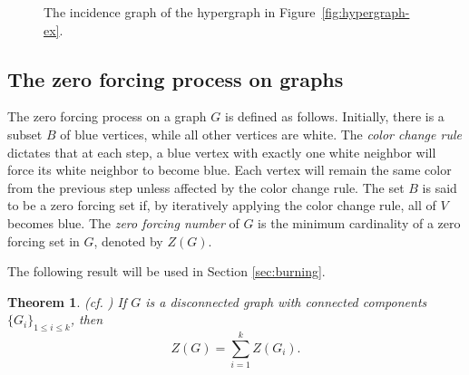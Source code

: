 \documentclass[12pt]{article}
\theoremstyle{plain}
\newtheorem{theorem}{Theorem}[section]
\theoremstyle{definition}
\theoremstyle{remark}
\begin{document}
\begin{figure}[htp!]
    \caption{The incidence graph of the hypergraph in Figure~\ref{fig:hypergraph-ex}.}
    \label{fig:incidence-graph-ex}
\end{figure}




\subsection{The zero forcing process on graphs}

The {zero forcing process} on a graph $G$ is defined as follows. Initially, there is a subset $B$ of blue vertices, while all other vertices are white. 
The \emph{color change rule} dictates that at each step, a blue vertex
with exactly one white neighbor will force its white neighbor to become blue. 
Each vertex will remain the same color from the previous step unless affected by the color change rule.
The set $B$ is said to be a zero forcing set if, by iteratively applying the color change rule, all of $V$ becomes blue. The \emph{zero forcing number} of $G$ is the minimum cardinality of a zero
forcing set in $G$, denoted by $Z(G)$. 
 
 

The following result will be used in Section \ref{sec:burning}.

\begin{theorem}(cf. \cite{hogben2022inverse})
If $G$ is a disconnected graph with connected components $\{G_i\}_{1\leq i\leq k}$, then
    \[ Z(G)=\sum_{i=1}^{k}Z(G_i).
    \]
    \label{thm:connected components zero forcing number}
\end{theorem}
 
\end{document}
